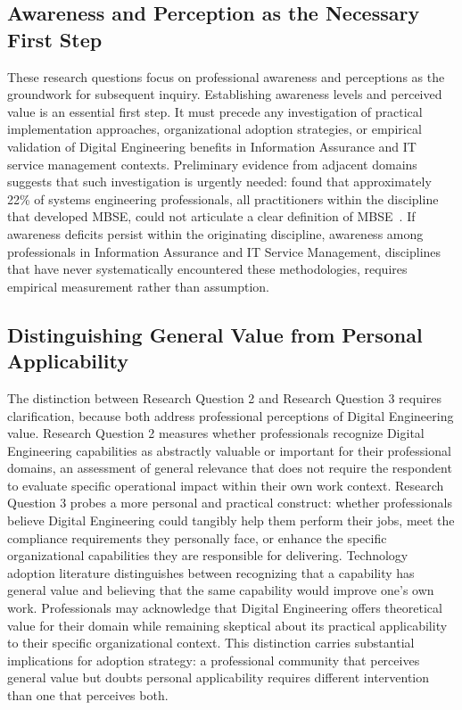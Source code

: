 \subsection{Awareness and Perception as the Necessary First Step}

These research questions focus on professional awareness and perceptions as the groundwork for subsequent inquiry. Establishing awareness levels and perceived value is an essential first step. It must precede any investigation of practical implementation approaches, organizational adoption strategies, or empirical validation of Digital Engineering benefits in Information Assurance and IT service management contexts. Preliminary evidence from adjacent domains suggests that such investigation is urgently needed: \citeauthor{Henderson_McDermott_Salado_2024} found that approximately 22\% of systems engineering professionals, all practitioners within the discipline that developed MBSE, could not articulate a clear definition of MBSE~\parencite{Henderson_McDermott_Salado_2024}. If awareness deficits persist within the originating discipline, awareness among professionals in Information Assurance and IT Service Management, disciplines that have never systematically encountered these methodologies, requires empirical measurement rather than assumption.

\subsection{Distinguishing General Value from Personal Applicability}

The distinction between Research Question 2 and Research Question 3 requires clarification, because both address professional perceptions of Digital Engineering value. Research Question 2 measures whether professionals recognize Digital Engineering capabilities as abstractly valuable or important for their professional domains, an assessment of general relevance that does not require the respondent to evaluate specific operational impact within their own work context. Research Question 3 probes a more personal and practical construct: whether professionals believe Digital Engineering could tangibly help them perform their jobs, meet the compliance requirements they personally face, or enhance the specific organizational capabilities they are responsible for delivering. Technology adoption literature distinguishes between recognizing that a capability has general value and believing that the same capability would improve one's own work. Professionals may acknowledge that Digital Engineering offers theoretical value for their domain while remaining skeptical about its practical applicability to their specific organizational context. This distinction carries substantial implications for adoption strategy: a professional community that perceives general value but doubts personal applicability requires different intervention than one that perceives both.

